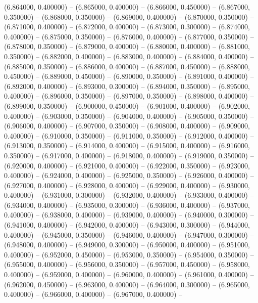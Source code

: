 (6.864000, 0.400000) -- 
(6.865000, 0.400000) -- 
(6.866000, 0.450000) -- 
(6.867000, 0.350000) -- 
(6.868000, 0.350000) -- 
(6.869000, 0.400000) -- 
(6.870000, 0.350000) -- 
(6.871000, 0.400000) -- 
(6.872000, 0.400000) -- 
(6.873000, 0.300000) -- 
(6.874000, 0.400000) -- 
(6.875000, 0.350000) -- 
(6.876000, 0.400000) -- 
(6.877000, 0.350000) -- 
(6.878000, 0.350000) -- 
(6.879000, 0.400000) -- 
(6.880000, 0.400000) -- 
(6.881000, 0.350000) -- 
(6.882000, 0.400000) -- 
(6.883000, 0.400000) -- 
(6.884000, 0.400000) -- 
(6.885000, 0.350000) -- 
(6.886000, 0.400000) -- 
(6.887000, 0.450000) -- 
(6.888000, 0.450000) -- 
(6.889000, 0.450000) -- 
(6.890000, 0.350000) -- 
(6.891000, 0.400000) -- 
(6.892000, 0.400000) -- 
(6.893000, 0.300000) -- 
(6.894000, 0.350000) -- 
(6.895000, 0.400000) -- 
(6.896000, 0.350000) -- 
(6.897000, 0.350000) -- 
(6.898000, 0.400000) -- 
(6.899000, 0.350000) -- 
(6.900000, 0.450000) -- 
(6.901000, 0.400000) -- 
(6.902000, 0.400000) -- 
(6.903000, 0.350000) -- 
(6.904000, 0.400000) -- 
(6.905000, 0.350000) -- 
(6.906000, 0.400000) -- 
(6.907000, 0.350000) -- 
(6.908000, 0.400000) -- 
(6.909000, 0.400000) -- 
(6.910000, 0.350000) -- 
(6.911000, 0.350000) -- 
(6.912000, 0.400000) -- 
(6.913000, 0.350000) -- 
(6.914000, 0.400000) -- 
(6.915000, 0.400000) -- 
(6.916000, 0.350000) -- 
(6.917000, 0.400000) -- 
(6.918000, 0.400000) -- 
(6.919000, 0.350000) -- 
(6.920000, 0.400000) -- 
(6.921000, 0.400000) -- 
(6.922000, 0.350000) -- 
(6.923000, 0.400000) -- 
(6.924000, 0.400000) -- 
(6.925000, 0.350000) -- 
(6.926000, 0.400000) -- 
(6.927000, 0.400000) -- 
(6.928000, 0.400000) -- 
(6.929000, 0.400000) -- 
(6.930000, 0.400000) -- 
(6.931000, 0.300000) -- 
(6.932000, 0.400000) -- 
(6.933000, 0.400000) -- 
(6.934000, 0.400000) -- 
(6.935000, 0.300000) -- 
(6.936000, 0.400000) -- 
(6.937000, 0.400000) -- 
(6.938000, 0.400000) -- 
(6.939000, 0.400000) -- 
(6.940000, 0.300000) -- 
(6.941000, 0.400000) -- 
(6.942000, 0.400000) -- 
(6.943000, 0.300000) -- 
(6.944000, 0.400000) -- 
(6.945000, 0.350000) -- 
(6.946000, 0.400000) -- 
(6.947000, 0.300000) -- 
(6.948000, 0.400000) -- 
(6.949000, 0.300000) -- 
(6.950000, 0.400000) -- 
(6.951000, 0.400000) -- 
(6.952000, 0.450000) -- 
(6.953000, 0.350000) -- 
(6.954000, 0.350000) -- 
(6.955000, 0.400000) -- 
(6.956000, 0.350000) -- 
(6.957000, 0.450000) -- 
(6.958000, 0.400000) -- 
(6.959000, 0.400000) -- 
(6.960000, 0.400000) -- 
(6.961000, 0.400000) -- 
(6.962000, 0.450000) -- 
(6.963000, 0.400000) -- 
(6.964000, 0.300000) -- 
(6.965000, 0.400000) -- 
(6.966000, 0.400000) -- 
(6.967000, 0.400000) -- 
